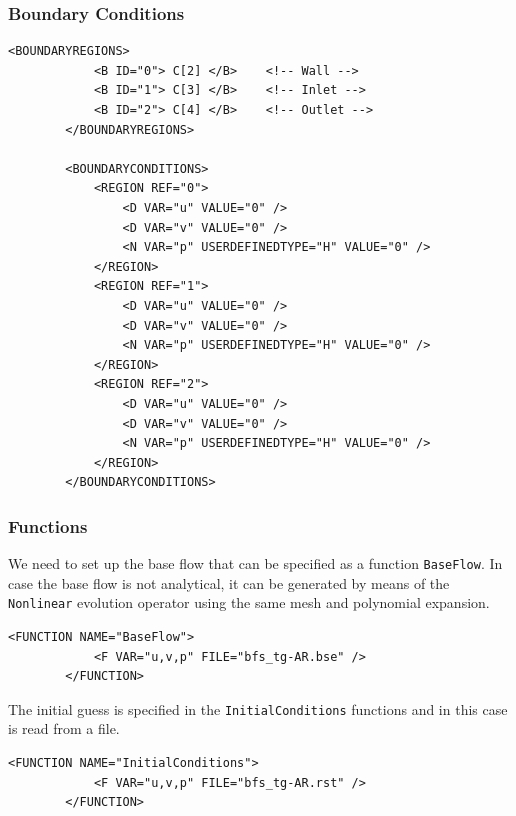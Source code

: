                         
\subsubsection{Boundary Conditions}

      \begin{lstlisting}[style=XMLStyle]
 <BOUNDARYREGIONS>
            <B ID="0"> C[2] </B>    <!-- Wall -->
            <B ID="1"> C[3] </B>    <!-- Inlet -->
            <B ID="2"> C[4] </B>    <!-- Outlet -->
        </BOUNDARYREGIONS>

        <BOUNDARYCONDITIONS>
            <REGION REF="0">
                <D VAR="u" VALUE="0" />
                <D VAR="v" VALUE="0" />
                <N VAR="p" USERDEFINEDTYPE="H" VALUE="0" />
            </REGION>
            <REGION REF="1">
                <D VAR="u" VALUE="0" />
                <D VAR="v" VALUE="0" />
                <N VAR="p" USERDEFINEDTYPE="H" VALUE="0" />
            </REGION>
            <REGION REF="2">
                <D VAR="u" VALUE="0" />
                <D VAR="v" VALUE="0" />
                <N VAR="p" USERDEFINEDTYPE="H" VALUE="0" />
            </REGION>
        </BOUNDARYCONDITIONS>
                                \end{lstlisting}

\subsubsection{Functions}

We need to set up the base flow that can be specified as a function \texttt{BaseFlow}. In case the base flow is not analytical, it can be generated by means of the \texttt{Nonlinear} evolution operator using the same mesh and polynomial expansion.

      \begin{lstlisting}[style=XMLStyle]
<FUNCTION NAME="BaseFlow">
            <F VAR="u,v,p" FILE="bfs_tg-AR.bse" />
        </FUNCTION>
                                        \end{lstlisting}


The initial guess is specified in the \texttt{InitialConditions} functions and in this case is read from a file. 
 
 \begin{lstlisting}[style=XMLStyle]  
<FUNCTION NAME="InitialConditions">
            <F VAR="u,v,p" FILE="bfs_tg-AR.rst" />
        </FUNCTION>
                                        \end{lstlisting}


